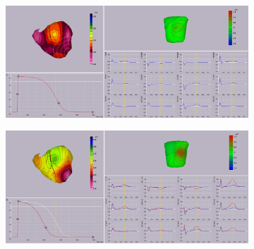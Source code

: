 \documentclass[12pt]{article}
\begin{document}
\begin{figure}[H]
	\centering
	\begin{subfigure}{\textwidth}
		\centering
		\includegraphics[width = \textwidth]{Figures/baselineBSO.png}
		\caption{}
		\label{BSP:Baseline}
	\end{subfigure}
	\begin{subfigure}{\textwidth}
		\centering
		\includegraphics[width = \textwidth]{Figures/AltAPD_BSP.png}
		\caption{}
		\label{BSP:alt}
	\end{subfigure}

	
	\caption{}
	\label{fig:BSP}
\end{figure}
\end{document}
